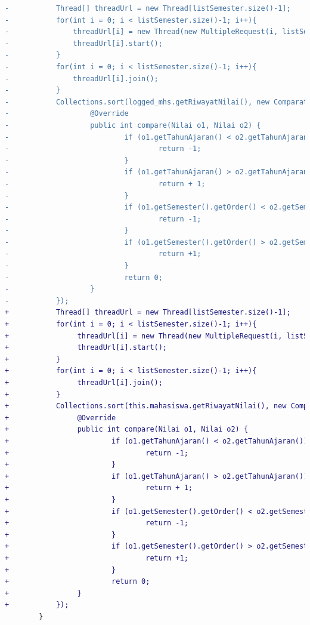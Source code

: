 \begin{itemize}
\begin{lstlisting}[language=diff, caption=Perubahan Implementasi Jsoup Halaman Daftar Perkembangan Studi, label=diff_halaman_dps]
-           Thread[] threadUrl = new Thread[listSemester.size()-1];
-           for(int i = 0; i < listSemester.size()-1; i++){
-               threadUrl[i] = new Thread(new MultipleRequest(i, listSemester, NILAI_URL, phpsessid, logged_mhs));
-               threadUrl[i].start();
-           }
-           for(int i = 0; i < listSemester.size()-1; i++){
-               threadUrl[i].join();
-           }
-           Collections.sort(logged_mhs.getRiwayatNilai(), new Comparator<Nilai>() {
-                   @Override
-                   public int compare(Nilai o1, Nilai o2) {
-                           if (o1.getTahunAjaran() < o2.getTahunAjaran()) {
-                                   return -1;
-                           }
-                           if (o1.getTahunAjaran() > o2.getTahunAjaran()) {
-                                   return + 1;
-                           }
-                           if (o1.getSemester().getOrder() < o2.getSemester().getOrder()) {
-                                   return -1;
-                           }
-                           if (o1.getSemester().getOrder() > o2.getSemester().getOrder()) {
-                                   return +1;
-                           }
-                           return 0;
-                   }
-           });
+           Thread[] threadUrl = new Thread[listSemester.size()-1];
+           for(int i = 0; i < listSemester.size()-1; i++){
+                threadUrl[i] = new Thread(new MultipleRequest(i, listSemester, NILAI_URL, phpsessid, this.mahasiswa));
+                threadUrl[i].start();
+           }
+           for(int i = 0; i < listSemester.size()-1; i++){
+                threadUrl[i].join();
+           }
+           Collections.sort(this.mahasiswa.getRiwayatNilai(), new Comparator<Nilai>() {
+                @Override
+                public int compare(Nilai o1, Nilai o2) {
+                        if (o1.getTahunAjaran() < o2.getTahunAjaran()) {
+                                return -1;
+                        }
+                        if (o1.getTahunAjaran() > o2.getTahunAjaran()) {
+                                return + 1;
+                        }
+                        if (o1.getSemester().getOrder() < o2.getSemester().getOrder()) {
+                                return -1;
+                        }
+                        if (o1.getSemester().getOrder() > o2.getSemester().getOrder()) {
+                                return +1;
+                        }
+                        return 0;
+                }
+           });
        }
        \end{lstlisting}
        

\end{itemize}
